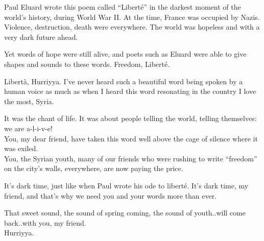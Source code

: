 Paul Eluard wrote this poem called ``Liberté'' in the darkest moment of
the world's history, during World War II. At the time, France was
occupied by Nazis. Violence, destruction, death were everywhere. The
world was hopeless and with a very dark future ahead.

Yet words of hope were still alive, and poets such as Eluard were able
to give shapes and sounds to these words. Freedom, Liberté.

Libertà, Hurriyya. I've never heard such a beautiful word being spoken
by a human voice as much as when I heard this word resonating in the
country I love the most, Syria.

It was the chant of life. It was about people telling the world, telling
themselves: we are a-l-i-v-e!\\
You, my dear friend, have taken this word well above the cage of silence
where it was exiled.\\
You, the Syrian youth, many of our friends who were rushing to write
``freedom'' on the city's walls, everywhere, are now paying the price.

It's dark time, just like when Paul wrote his ode to liberté. It's dark
time, my friend, and that's why we need you and your words more than
ever.

That sweet sound, the sound of spring coming, the sound of youth..will
come back..with you, my friend.\\
Hurriyya.
